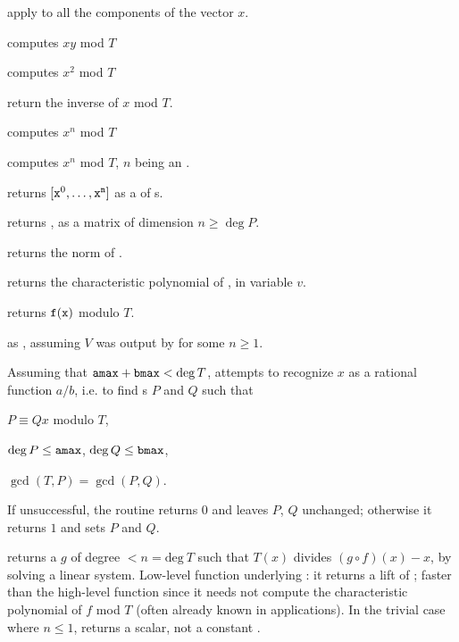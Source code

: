 
 apply 
to all the components of the vector $x$.


 computes $xy$ mod $T$

 computes $x^2$ mod $T$

 return the inverse of $x$ mod $T$.

 computes $x^n$ mod $T$

 computes $x^n$ mod $T$,
$n$ being an .

 returns $[{\tt x}^0,
\dots, {\tt x}^{\tt n}]$ as a  of s.

 returns
, as a matrix of dimension $n \geq \deg P$.

 returns the norm of .

 returns the characteristic
polynomial of , in variable $v$.

 returns ${\tt f}({\tt x})$ modulo
$T$.

 as ,
assuming $V$ was output by  for some $n\geq 1$.

Assuming that ${\tt amax}+{\tt bmax}<\deg T$, attempts to recognize $x$ as a
rational function $a/b$, i.e. to find s $P$ and $Q$ such that

\item $P \equiv Q x$ modulo $T$,

\item $\deg P \leq {\tt amax}$, $\deg Q \leq {\tt bmax}$,

\item $\gcd(T,P) = \gcd(P,Q)$.

\noindent If unsuccessful, the routine returns $0$ and leaves $P$, $Q$
unchanged; otherwise it returns $1$ and sets $P$ and $Q$.

 returns a  $g$ of degree $< n
= \text{deg}~T$ such that $T(x)$ divides $(g \circ f)(x) - x$, by solving a
linear system. Low-level function underlying : it returns a
lift of \kbd[modreverse(f,T)]; faster than the high-level function since it
needs not compute the characteristic polynomial of $f$ mod $T$ (often already
known in applications). In the trivial case where $n \leq 1$, returns a
scalar, not a constant .

